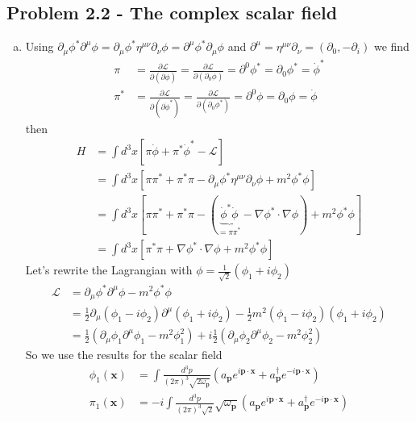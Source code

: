 \documentclass[10pt,a4paper]{book}
\theoremstyle{definition}
\begin{document}
\subsection{Problem 2.2 - The complex scalar field}
\begin{enumerate}[(a)]
\item Using $\partial_\mu\phi^*\partial^\mu\phi=\partial_\mu\phi^*\eta^{\mu\nu}\partial_\nu\phi=\partial^\mu\phi^*\partial_\mu\phi$ and $\partial^\mu=\eta^{\mu\nu}\partial_\nu=(\partial_0,-\partial_i)$ we find 
\begin{align}
\pi
&=\frac{\partial\mathcal{L}}{\partial(\partial\dot\phi)}=\frac{\partial\mathcal{L}}{\partial(\partial_0\phi)}=\partial^0\phi^*=\partial_0\phi^*=\dot\phi^*\\
\pi^*
&=\frac{\partial\mathcal{L}}{\partial(\partial\dot\phi^*)}=\frac{\partial\mathcal{L}}{\partial(\partial_0\phi^*)}=\partial^0\phi=\partial_0\phi=\dot\phi
\end{align}
then
\begin{align}
H&=\int d^3x[\pi\dot\phi+\pi^*\dot\phi^*-\mathcal{L}]\\
&=\int d^3x[\pi\pi^*+\pi^*\pi-\partial_\mu\phi^*\eta^{\mu\nu}\partial_\nu\phi+m^2\phi^*\phi]\\
&=\int d^3x[\pi\pi^*+\pi^*\pi-(\underbrace{\dot\phi^*\dot\phi}_{=\pi\pi^*}-\nabla\phi^*\cdot\nabla\phi)+m^2\phi^*\phi]\\
&=\int d^3x[\pi^*\pi+\nabla\phi^*\cdot\nabla\phi+m^2\phi^*\phi]
\end{align}
Let's rewrite the Lagrangian with $\phi=\frac{1}{\sqrt{2}}(\phi_1+i\phi_2)$
\begin{align}
\mathcal{L}&=\partial_\mu\phi^*\partial^\mu\phi-m^2\phi^*\phi\\
&=\frac{1}{2}\partial_\mu(\phi_1-i\phi_2)\partial^\mu(\phi_1+i\phi_2)-\frac{1}{2}m^2(\phi_1-i\phi_2)(\phi_1+i\phi_2)\\
&=\frac{1}{2}(\partial_\mu\phi_1\partial^\mu\phi_1-m^2\phi_1^2)+i\frac{1}{2}(\partial_\mu\phi_2\partial^\mu\phi_2-m^2\phi_2^2)
\end{align}
So we use the results for the scalar field
\begin{align}
\phi_1(\mathbf{x})&=\int\frac{d^3p}{(2\pi)^3\sqrt{2\omega_\mathbf{p}}}\left(a_\mathbf{p}e^{i\mathbf{p}\cdot\mathbf{x}}+a^\dagger_\mathbf{p}e^{-i\mathbf{p}\cdot\mathbf{x}}\right)\\
\pi_1(\mathbf{x})&=-i\int\frac{d^3p}{(2\pi)^3\sqrt{2}}\sqrt{\omega_\mathbf{p}}\left(a_\mathbf{p}e^{i\mathbf{p}\cdot\mathbf{x}}+a^\dagger_\mathbf{p}e^{-i\mathbf{p}\cdot\mathbf{x}}\right)\\

\end{align}
\end{enumerate}
\end{document}
